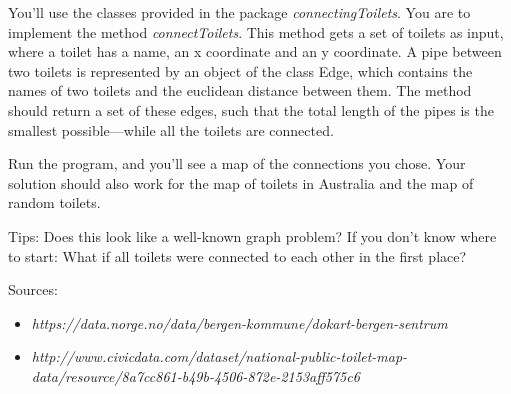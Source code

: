 \documentclass[11pt]{article}
\begin{document}
    You'll use the classes provided in the package \textit{connectingToilets}. You are to implement the method \textit{connectToilets}. This method gets a set of toilets as input, where a toilet has a name, an x coordinate and an y coordinate. A pipe between two toilets is represented by an object of the class Edge, which contains the names of two toilets and the euclidean distance between them. The method should return a set of these edges, such that the total length of the pipes is the smallest possible---while all the toilets are connected.

    Run the program, and you'll see a map of the connections you chose. Your solution should also work for the map of toilets in Australia and the map of random toilets.

    Tips: Does this look like a well-known graph problem? If you don't know where to start: What if all toilets were connected to each other in the first place?



    Sources:
    \begin{itemize}
      \item
      \textit{https://data.norge.no/data/bergen-kommune/dokart-bergen-sentrum}
      \item \textit{http://www.civicdata.com/dataset/national-public-toilet-map-data/\linebreak[4]resource/8a7cc861-b49b-4506-872e-2153aff575c6}
    \end{itemize}

    
\end{document}
